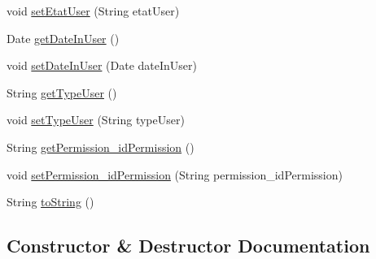 \begin{DoxyCompactItemize}
void \hyperlink{classcom_1_1ecetech_1_1bti4_1_1itproject_1_1classified_1_1beans_1_1_user_a0cd1bf5e70a6afd7298d8d9af09eba02}{set\+Etat\+User} (String etat\+User)
\item 
Date \hyperlink{classcom_1_1ecetech_1_1bti4_1_1itproject_1_1classified_1_1beans_1_1_user_a76f5313872cb662f806666e66259d966}{get\+Date\+In\+User} ()
\item 
void \hyperlink{classcom_1_1ecetech_1_1bti4_1_1itproject_1_1classified_1_1beans_1_1_user_ac0a8f564bafaf2bc5a8fe7400d3c3a69}{set\+Date\+In\+User} (Date date\+In\+User)
\item 
String \hyperlink{classcom_1_1ecetech_1_1bti4_1_1itproject_1_1classified_1_1beans_1_1_user_a4ffa8a685982ba25a4aee470ec04f155}{get\+Type\+User} ()
\item 
void \hyperlink{classcom_1_1ecetech_1_1bti4_1_1itproject_1_1classified_1_1beans_1_1_user_a1cf4284ae25ab016e2810ac4dbd879eb}{set\+Type\+User} (String type\+User)
\item 
String \hyperlink{classcom_1_1ecetech_1_1bti4_1_1itproject_1_1classified_1_1beans_1_1_user_a5d4584e8b95d84f387f7a7a53a39cb18}{get\+Permission\+\_\+id\+Permission} ()
\item 
void \hyperlink{classcom_1_1ecetech_1_1bti4_1_1itproject_1_1classified_1_1beans_1_1_user_a136371a93386e79e9707d691c1c6a826}{set\+Permission\+\_\+id\+Permission} (String permission\+\_\+id\+Permission)
\item 
String \hyperlink{classcom_1_1ecetech_1_1bti4_1_1itproject_1_1classified_1_1beans_1_1_user_a2f740d2f78ef0baf9c907bf92ca5875d}{to\+String} ()
\end{DoxyCompactItemize}


\subsection{Constructor \& Destructor Documentation}
